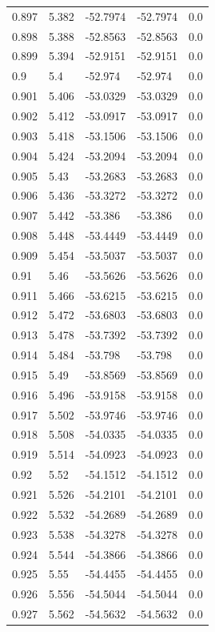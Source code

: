 \begin{table}[H]
\begin{tabular}{lllll}
0.897 & 5.382 & -52.7974 & -52.7974 & 0.0 \\
0.898 & 5.388 & -52.8563 & -52.8563 & 0.0 \\
0.899 & 5.394 & -52.9151 & -52.9151 & 0.0 \\
0.9 & 5.4 & -52.974 & -52.974 & 0.0 \\
0.901 & 5.406 & -53.0329 & -53.0329 & 0.0 \\
0.902 & 5.412 & -53.0917 & -53.0917 & 0.0 \\
0.903 & 5.418 & -53.1506 & -53.1506 & 0.0 \\
0.904 & 5.424 & -53.2094 & -53.2094 & 0.0 \\
0.905 & 5.43 & -53.2683 & -53.2683 & 0.0 \\
0.906 & 5.436 & -53.3272 & -53.3272 & 0.0 \\
0.907 & 5.442 & -53.386 & -53.386 & 0.0 \\
0.908 & 5.448 & -53.4449 & -53.4449 & 0.0 \\
0.909 & 5.454 & -53.5037 & -53.5037 & 0.0 \\
0.91 & 5.46 & -53.5626 & -53.5626 & 0.0 \\
0.911 & 5.466 & -53.6215 & -53.6215 & 0.0 \\
0.912 & 5.472 & -53.6803 & -53.6803 & 0.0 \\
0.913 & 5.478 & -53.7392 & -53.7392 & 0.0 \\
0.914 & 5.484 & -53.798 & -53.798 & 0.0 \\
0.915 & 5.49 & -53.8569 & -53.8569 & 0.0 \\
0.916 & 5.496 & -53.9158 & -53.9158 & 0.0 \\
0.917 & 5.502 & -53.9746 & -53.9746 & 0.0 \\
0.918 & 5.508 & -54.0335 & -54.0335 & 0.0 \\
0.919 & 5.514 & -54.0923 & -54.0923 & 0.0 \\
0.92 & 5.52 & -54.1512 & -54.1512 & 0.0 \\
0.921 & 5.526 & -54.2101 & -54.2101 & 0.0 \\
0.922 & 5.532 & -54.2689 & -54.2689 & 0.0 \\
0.923 & 5.538 & -54.3278 & -54.3278 & 0.0 \\
0.924 & 5.544 & -54.3866 & -54.3866 & 0.0 \\
0.925 & 5.55 & -54.4455 & -54.4455 & 0.0 \\
0.926 & 5.556 & -54.5044 & -54.5044 & 0.0 \\
0.927 & 5.562 & -54.5632 & -54.5632 & 0.0 \\

\end{tabular}
\end{table}
